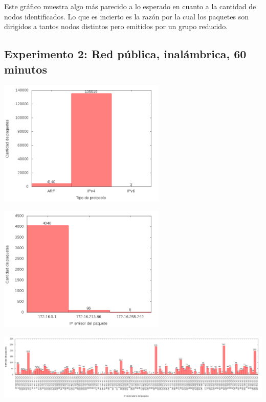 Este gráfico muestra algo más parecido a lo esperado en cuanto a la cantidad de nodos identificados. Lo que es incierto es la razón por la cual
los paquetes son dirigidos a tantos nodos distintos pero emitidos por un grupo reducido.

\subsection{Experimento 2: Red pública, inalámbrica, 60 minutos}

\begin{center}
\includegraphics[width=8cm]{../mediciones/altop-wifi-60/altop60Protocolos.png}
\end{center}

\begin{center}
\includegraphics[width=8cm]{../mediciones/altop-wifi-60/altop60IpsSrcArp.png}
\end{center}

\begin{center}
\includegraphics[width=16cm]{../mediciones/altop-wifi-60/altop60IpsDstArp.png}
\end{center}


